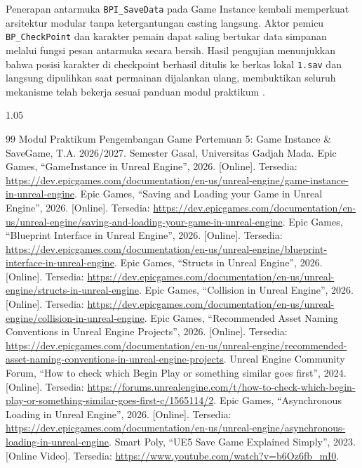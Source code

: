 \documentclass[a4paper,oneside,12pt]{report}
\renewcommand{\bibname}{Daftar Pustaka}
\begin{document}
Penerapan antarmuka \texttt{BPI\_SaveData} pada Game Instance kembali memperkuat arsitektur modular tanpa ketergantungan casting langsung. Aktor pemicu \texttt{BP\_CheckPoint} dan karakter pemain dapat saling bertukar data simpanan melalui fungsi pesan antarmuka secara bersih. Hasil pengujian menunjukkan bahwa posisi karakter di checkpoint berhasil ditulis ke berkas lokal \texttt{1.sav} dan langsung dipulihkan saat permainan dijalankan ulang, membuktikan seluruh mekanisme telah bekerja sesuai panduan modul praktikum \cite{modul5}.

\clearpage
{}
\renewcommand{\bibname}{Daftar Pustaka}
\begin{spacing}{1.05}
\begin{thebibliography}{99}
    \setlength{\itemsep}{0.15em}
     Modul Praktikum Pengembangan Game Pertemuan 5: Game Instance \& SaveGame, T.A. 2026/2027. Semester Gasal, Universitas Gadjah Mada.
     Epic Games, ``GameInstance in Unreal Engine'', 2026. [Online]. Tersedia: \url{https://dev.epicgames.com/documentation/en-us/unreal-engine/game-instance-in-unreal-engine}.
     Epic Games, ``Saving and Loading your Game in Unreal Engine'', 2026. [Online]. Tersedia: \url{https://dev.epicgames.com/documentation/en-us/unreal-engine/saving-and-loading-your-game-in-unreal-engine}.
     Epic Games, ``Blueprint Interface in Unreal Engine'', 2026. [Online]. Tersedia: \url{https://dev.epicgames.com/documentation/en-us/unreal-engine/blueprint-interface-in-unreal-engine}.
     Epic Games, ``Structs in Unreal Engine'', 2026. [Online]. Tersedia: \url{https://dev.epicgames.com/documentation/en-us/unreal-engine/structs-in-unreal-engine}.
     Epic Games, ``Collision in Unreal Engine'', 2026. [Online]. Tersedia: \url{https://dev.epicgames.com/documentation/en-us/unreal-engine/collision-in-unreal-engine}.
     Epic Games, ``Recommended Asset Naming Conventions in Unreal Engine Projects'', 2026. [Online]. Tersedia: \url{https://dev.epicgames.com/documentation/en-us/unreal-engine/recommended-asset-naming-conventions-in-unreal-engine-projects}.
     Unreal Engine Community Forum, ``How to check which Begin Play or something similar goes first'', 2024. [Online]. Tersedia: \url{https://forums.unrealengine.com/t/how-to-check-which-begin-play-or-something-similar-goes-first-c/1565114/2}.
     Epic Games, ``Asynchronous Loading in Unreal Engine'', 2026. [Online]. Tersedia: \url{https://dev.epicgames.com/documentation/en-us/unreal-engine/asynchronous-loading-in-unreal-engine}.
     Smart Poly, ``UE5 Save Game Explained Simply'', 2023. [Online Video]. Tersedia: \url{https://www.youtube.com/watch?v=b6Oz6fb_mI0}.
\end{thebibliography}
\end{spacing}
\end{document}
